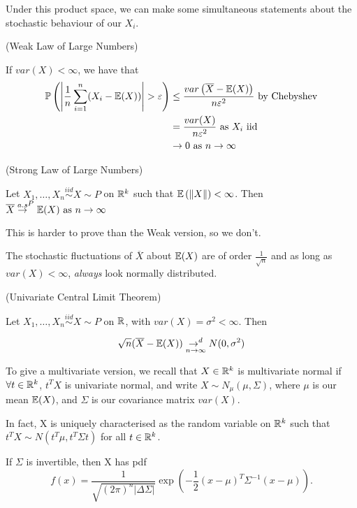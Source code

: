 \documentclass[a4paper]{article}
\begin{document}
Under this product space, we can make some simultaneous statements about the stochastic behaviour of our $X_i$.

\begin{thm}
	(Weak Law of Large Numbers)

	If $var(X) < \infty$, we have that 
	\begin{align*}
		\mathbb{P}\left( \left| \frac{1}{n}\sum_{i=1}^{n} (X_{i} - \mathbb{E}(X)) \right| > \varepsilon \right) &\le \frac{var\left( \overline{X} - \mathbb{E}(X) \right)}{n\varepsilon^2} \text{ by Chebyshev} \\ 
		&= \frac{var(X)}{n\varepsilon^2} \text{ as $X_i$ iid}\\
		&\to 0 \text{ as  } n \to \infty
	\end{align*}
\end{thm}	

\begin{thm}
	(Strong Law of Large Numbers)

	Let $X_1, \ldots, X_n \stackrel{iid}{\sim} X \sim P$ on $\mathbb{R}^{k}$ such that $\mathbb{E}\left(\|X\|  \right)  < \infty$. Then $\overline{X} \overset{a.s}{\to}^{P} \mathbb{E}(X) \text{ as } n \to \infty$
\end{thm}

This is harder to prove than the Weak version, so we don't.

The stochastic fluctuations of $\overline{X}$ about $\mathbb{E}(X)$ are of order $\frac{1}{\sqrt{n} }$ and as long as $var(X) < \infty$, \textit{always} look normally distributed.

\begin{thm}
	(Univariate Central Limit Theorem)

	Let $X_1, \ldots, X_n \stackrel{iid}{\sim} X \sim P$ on $\mathbb{R}$, with $var(X) = \sigma^2 < \infty$. Then

	\[
		\sqrt{n} (\overline{X} - \mathbb{E}(X)) \underset{n \to  \infty}{\to^{d}} N(0, \sigma^2)
	\] 
\end{thm}

To give a multivariate version, we recall that $X \in \mathbb{R}^{k}$ is multivariate normal if $\forall t \in \mathbb{R}^{k}$, $t^{T}X$ is univariate normal, and write $X\sim N_{\mu}(\mu, \Sigma)$, where $\mu$ is our mean  $\mathbb{E}(X)$, and  $\Sigma $ is our covariance matrix $var(X)$.

In fact, X is uniquely characterised as the random variable on  $\mathbb{R}^{k}$ such that $t ^{T}X \sim N(t ^{T}\mu, t ^{T}\Sigma t)$ for all $t \in \mathbb{R}^{k}$.

If $\Sigma$ is invertible, then X has pdf
\[
	f(x) = \frac{1}{\sqrt{(2\pi)^{n}|\Delta \Sigma|} } \exp\left( - \frac{1}{2} (x-\mu)^{T} \Sigma^{-1} (x - \mu) \right) 
.\] 
\end{document}
